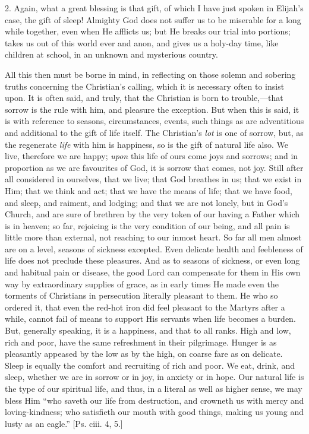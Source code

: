 2. Again, what a great blessing is that gift, of which I have just
spoken in Elijah's case, the gift of sleep! Almighty God does not
suffer us to be miserable for a long while together, even when He
afflicts us; but He breaks our trial into portions; takes us out of
this world ever and anon, and gives us a holy-day time, like children
at school, in an unknown and mysterious country.

All this then must be borne in mind, in reflecting on those solemn
and sobering truths concerning the Christian's calling, which it is
necessary often to insist upon. It is often said, and truly, that the
Christian is born to trouble,—that sorrow is the rule with him, and
pleasure the exception. But when this is said, it is with reference to
seasons, circumstances, events, such things as are adventitious and
additional to the gift of life itself. The Christian's \emph{lot} is
one of sorrow, but, as the regenerate \emph{life} with him is
happiness, so is the gift of natural life also. We live, therefore we
are happy; \emph{upon} this life of ours come joys and sorrows; and in
proportion as we are favourites of God, it is sorrow that comes, not
joy. Still after all considered in ourselves, that we live; that God
breathes in us; that we exist in Him; that we think and act; that we
have the means of life; that we have food, and sleep, and raiment, and
lodging; and that we are not lonely, but in God's Church, and are sure
of brethren by the very token of our having a Father which is in
heaven; so far, rejoicing is the very condition of our being, and all
pain is little more than external, not reaching to our inmost heart.
So far all men almost are on a level, seasons of sickness excepted.
Even delicate health and feebleness of life does not preclude these
pleasures. And as to seasons of sickness, or even long and habitual
pain or disease, the good Lord can compensate for them in His own way
by extraordinary supplies of grace, as in early times He made even the
torments of Christians in persecution literally pleasant to them. He
who so ordered it, that even the red-hot iron did feel pleasant to the
Martyrs after a while, cannot fail of means to support His servants
when life becomes a burden. But, generally speaking, it is a
happiness, and that to all ranks. High and low, rich and poor, have
the same refreshment in their pilgrimage. Hunger is as pleasantly
appeased by the low as by the high, on coarse fare as on delicate.
Sleep is equally the comfort and recruiting of rich and poor. We eat,
drink, and sleep, whether we are in sorrow or in joy, in anxiety or in
hope. Our natural life is the type of our spiritual life, and thus, in
a literal as well as higher sense, we may bless Him ``who saveth
our life from destruction, and crowneth us with mercy and
loving-kindness; who satisfieth our mouth with good things, making us
young and lusty as an eagle.'' [Ps. ciii. 4, 5.]


